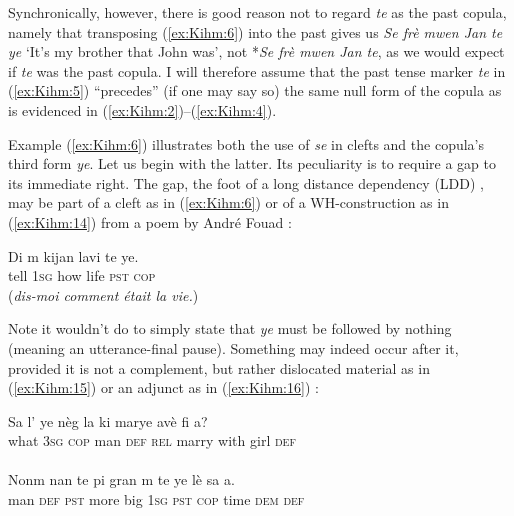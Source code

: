 \documentclass[output=paper]{langsci/langscibook}
\begin{document}
Synchronically, however, there is good reason not to regard \emph{te} as
the past copula, namely that transposing (\ref{ex:Kihm:6}) into the past gives us
\emph{Se frè mwen Jan te ye} `It's my brother that John was', not
*\emph{Se frè mwen Jan te}, as we would expect if \emph{te} was the past
copula. I will therefore assume that the past tense marker \emph{te} in
(\ref{ex:Kihm:5}) ``precedes'' (if one may say so) the same null form of the copula as
is evidenced in (\ref{ex:Kihm:2})--(\ref{ex:Kihm:4}).

Example (\ref{ex:Kihm:6}) illustrates both the use of \emph{se} in clefts and the
copula's third form \emph{ye}. Let us begin with the latter. Its
peculiarity is to require a gap to its immediate right. The gap, the
foot of a long distance dependency (LDD) %
\citep{Sag03}%
%
, may be part of a
cleft as in (\ref{ex:Kihm:6}) or of a WH-construction as in (\ref{ex:Kihm:14}) from a poem by André
Fouad %
\citep[62]{ChalmersKenolEtAl2015}%
%
:


\ea\label{ex:Kihm:14} \gll Di m kijan lavi te ye.\\
tell \textsc{1sg} how life \textsc{pst} \textsc{cop} \\
\glt {} (\emph{dis-moi comment était la vie.}) \\
\z

Note it wouldn't do to simply state that \emph{ye} must be followed by
nothing (meaning an utterance-final pause). Something may indeed occur
after it, provided it is not a complement, but rather dislocated
material as in (\ref{ex:Kihm:15}) %
\citep[18]{Tessonneau80} %
%
or an adjunct as in (\ref{ex:Kihm:16})
%
\citep[148]{Deprez2003}%
%
:

\ea\label{ex:Kihm:15} \gll Sa l' ye nèg la ki marye avè fi a?\\
what \textsc{3sg} \textsc{cop} man \textsc{def} \textsc{rel} marry with girl \textsc{def} \\
\glt {} \\

\ex\label{ex:Kihm:16} \gll Nonm nan te pi gran m te ye lè sa a.\\
man \textsc{def} \textsc{pst} more big \textsc{1sg} \textsc{pst} \textsc{cop} time \textsc{dem} \textsc{def} \\
\glt {} \\
\z
\end{document}
